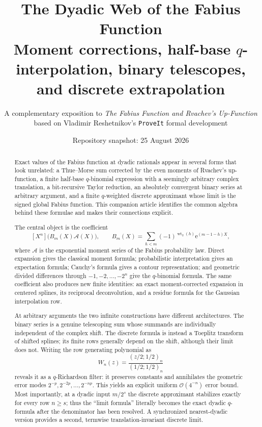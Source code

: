 \documentclass[11pt,oneside]{article}
\title{\bfseries The Dyadic Web of the Fabius Function\\[0.35em]
\large Moment corrections, half-base $q$-interpolation, binary telescopes,\\
and discrete extrapolation}
\author{A complementary exposition to \emph{The Fabius Function and Rvachev's Up-Function}\\
\small based on Vladimir Reshetnikov's \texttt{ProveIt} formal development}
\date{Repository snapshot: 25 August 2026}
\theoremstyle{definition}
\theoremstyle{remark}
\newcommand{\wt}{\operatorname{wt}_2}
\newcommand{\e}{\mathrm e}
\newcommand{\bigO}{\mathcal O}
\begin{document}
\maketitle

\begin{abstract}
Exact values of the Fabius function at dyadic rationals appear in several forms that look
unrelated: a Thue--Morse sum corrected by the even moments of Rvachev's up-function, a finite
half-base $q$-binomial expression with a seemingly arbitrary complex translation, a
bit-recursive Taylor reduction, an absolutely convergent binary series at arbitrary argument,
and a finite $q$-weighted discrete approximant whose limit is the signed global Fabius
function.  This companion article identifies the common algebra behind these formulae and
makes their connections explicit.

The central object is the coefficient
\[
 [X^n]\bigl(B_m(X)\mathscr A(X)\bigr),
 \qquad
 B_m(X)=\sum_{h<m}(-1)^{\wt(h)}\e^{(m-1-h)X},
\]
where $\mathscr A$ is the exponential moment series of the Fabius probability law.  Direct
expansion gives the classical moment formula; probabilistic interpretation gives an
expectation formula; Cauchy's formula gives a contour representation; and geometric divided
differences through $-1,-2,\ldots,-2^n$ give the $q$-binomial formula.  The same coefficient
also produces new finite identities: an exact moment-corrected expansion in centered splines,
its reciprocal deconvolution, and a residue formula for the Gaussian interpolation row.

At arbitrary arguments the two infinite constructions have different architectures.  The
binary series is a genuine telescoping sum whose summands are individually independent of the
complex shift.  The discrete formula is instead a Toeplitz transform of shifted splines; its
finite rows generally depend on the shift, although their limit does not.  Writing the row
generating polynomial as
\[
 W_n(z)=\frac{(z/2;1/2)_n}{(1/2;1/2)_n}
\]
reveals it as a $q$-Richardson filter: it preserves constants and annihilates the geometric
error modes $2^{-p},2^{-2p},\ldots,2^{-np}$.  This yields an explicit uniform
$\bigO(4^{-n})$ error bound.  Most importantly, at a dyadic input $m/2^s$ the discrete
approximant stabilizes exactly for every row $n\ge s$; thus the ``limit formula'' literally
becomes the exact dyadic $q$-formula after the denominator has been resolved.  A synchronized
nearest-dyadic version provides a second, termwise translation-invariant discrete limit.
\end{abstract}
\end{document}

